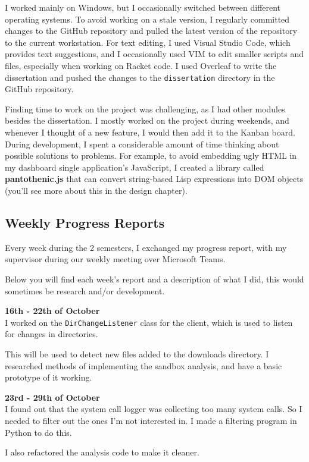 I worked mainly on Windows, but I occasionally switched
between different operating systems. To avoid working on
a stale version, I regularly committed changes to the
GitHub repository and pulled the latest version of the
repository to the current workstation. For text editing,
I used Visual Studio Code, which provides text suggestions,
and I occasionally used VIM to edit smaller scripts and files,
especially when working on Racket code.
I used Overleaf to write the dissertation and pushed the changes to the
\texttt{dissertation} directory in the GitHub repository.

Finding time to work on the project was challenging,
as I had other modules besides the dissertation.
I mostly worked on the project during weekends, and whenever
I thought of a new feature, I would then add it to the Kanban board.
During development, I spent a considerable amount of time thinking
about possible solutions to problems. For example,
to avoid embedding ugly HTML in my dashboard single application's JavaScript,
I created a library called \textbf{pantothenic.js} that can convert 
string-based Lisp expressions into DOM objects
(you'll see more about this in the design chapter).

\subsection{Weekly Progress Reports}
Every week during the 2 semesters, I exchanged my progress report,
with my supervisor during our weekly meeting over Microsoft Teams.

Below you will find each week's report and a description of what I did,
this would sometimes be research and/or development.

\textbf{16th - 22th of October} \\
I worked on the \texttt{DirChangeListener} class for the client,
which is used to listen for changes in directories.

This will be used to detect new files added to the downloads directory.
I researched methods of implementing the sandbox analysis,
and have a basic prototype of it working.

\textbf{23rd - 29th of October} \\
I found out that the system call logger was collecting too many system calls.
So I needed to filter out the ones I'm not interested in.
I made a filtering program in Python to do this.

I also refactored the analysis code to make it cleaner.

